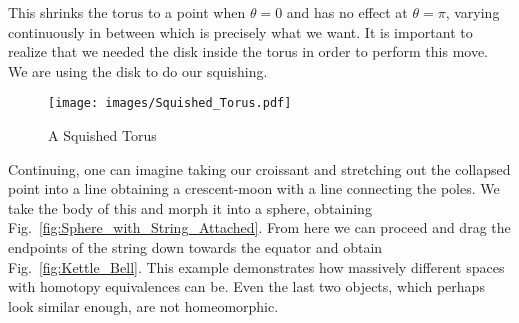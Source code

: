         This shrinks the torus to a point when $\theta=0$ and has no
        effect at $\theta=\pi$, varying continuously in between which is
        precisely what we want. It is important to realize that we
        needed the disk inside the torus in order to perform this move.
        We are using the disk to do our squishing.
        \begin{figure}[H]
            \centering
            \captionsetup{type=figure}
            \texttt{[image: images/Squished\_Torus.pdf]}
            \caption{A Squished Torus}
            \label{fig:Squished_Torus}
        \end{figure}
        \begin{minipage}{0.50\textwidth}
            Continuing, one can imagine taking our croissant and
            stretching out the collapsed point into a line obtaining a
            crescent-moon with a line connecting the poles. We take the
            body of this and morph it into a sphere, obtaining
            Fig.~\ref{fig:Sphere_with_String_Attached}. From here we can
            proceed and drag the endpoints of the string down towards
            the equator and obtain Fig.~\ref{fig:Kettle_Bell}. This
            example demonstrates how massively different spaces with
            homotopy equivalences can be. Even the last two objects,
            which perhaps look similar enough, are not homeomorphic.
        \end{minipage}
        \hfill
        \par\vspace{2.5ex}
